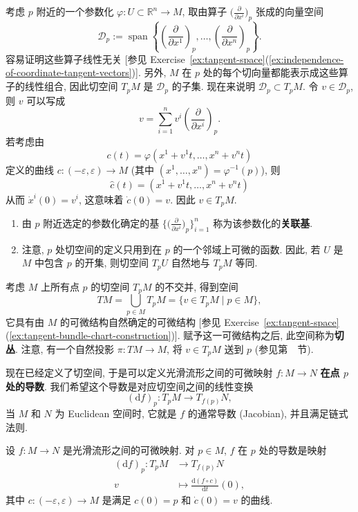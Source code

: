 \begin{RiemannProof}
考虑 $p$ 附近的一个参数化 $\varphi:U\subset\mathbb{R}^n\to M$, 取由算子 $\bigl(\frac{\partial}{\partial x^i}\bigr)_p$ 张成的向量空间
\[
  \mathcal{D}_p:=\operatorname{span}\left\{
  \left(\frac{\partial}{\partial x^1}\right)_p,\ldots,
  \left(\frac{\partial}{\partial x^n}\right)_p\right\}.
\]
容易证明这些算子线性无关 [参见 Exercise~\ref{ex:tangent-space}(\ref{ex:independence-of-coordinate-tangent-vectors})]. 另外, $M$ 在 $p$ 处的每个切向量都能表示成这些算子的线性组合, 因此切空间 $T_pM$ 是 $\mathcal{D}_p$ 的子集. 现在来说明 $\mathcal{D}_p\subset T_pM$. 令 $v\in\mathcal{D}_p$, 则 $v$ 可以写成
\[
  v=\sum_{i=1}^n v^i\left(\frac{\partial}{\partial x^i}\right)_p.
\]
若考虑由
\[
  c(t)=\varphi(x^1+v^1t,\ldots,x^n+v^nt)
\]
定义的曲线 $c:(-\varepsilon,\varepsilon)\to M$ (其中 $(x^1,\ldots,x^n)=\varphi^{-1}(p)$), 则
\[
  \widehat c(t)=(x^1+v^1t,\ldots,x^n+v^nt)
\]
从而 $\dot x^i(0)=v^i$, 这意味着 $\dot c(0)=v$. 因此 $v\in T_pM$.
\end{RiemannProof}

\begin{RiemannRemark}\label{rem:associated-basis-and-tangent-space-of-open-set}
\begin{enumerate}[label=(\arabic*),leftmargin=*]
\item 由 $p$ 附近选定的参数化确定的基 $\bigl\{\bigl(\frac{\partial}{\partial x^i}\bigr)_p\bigr\}_{i=1}^n$ 称为该参数化的\textbf{关联基}.
\item 注意, $p$ 处切空间的定义只用到在 $p$ 的一个邻域上可微的函数. 因此, 若 $U$ 是 $M$ 中包含 $p$ 的开集, 则切空间 $T_pU$ 自然地与 $T_pM$ 等同.
\end{enumerate}
\end{RiemannRemark}

考虑 $M$ 上所有点 $p$ 的切空间 $T_pM$ 的不交并, 得到空间
\[
  TM=\bigcup_{p\in M}T_pM=\{v\in T_pM\mid p\in M\},
\]
它具有由 $M$ 的可微结构自然确定的可微结构 [参见 Exercise~\ref{ex:tangent-space}(\ref{ex:tangent-bundle-chart-construction})]. 赋予这一可微结构之后, 此空间称为\textbf{切丛}. 注意, 有一个自然投影 $\pi:TM\to M$, 将 $v\in T_pM$ 送到 $p$ (参见第~~节).

现在已经定义了切空间, 于是可以定义光滑流形之间的可微映射 $f:M\to N$ \textbf{在点 $p$ 处的导数}. 我们希望这个导数是对应切空间之间的线性变换
\[
  (\mathrm{d}f)_p:T_pM\to T_{f(p)}N,
\]
当 $M$ 和 $N$ 为 Euclidean 空间时, 它就是 $f$ 的通常导数 (Jacobian), 并且满足链式法则.

\begin{RiemannDefinition}\label{def:derivative-of-manifold-map}
设 $f:M\to N$ 是光滑流形之间的可微映射. 对 $p\in M$, $f$ 在 $p$ 处的导数是映射
\begin{align*}
  (\mathrm{d}f)_p:T_pM&\to T_{f(p)}N\\
  v&\mapsto\frac{\mathrm{d}(f\circ c)}{\mathrm{d}t}(0),
\end{align*}
其中 $c:(-\varepsilon,\varepsilon)\to M$ 是满足 $c(0)=p$ 和 $\dot c(0)=v$ 的曲线.
\end{RiemannDefinition}


